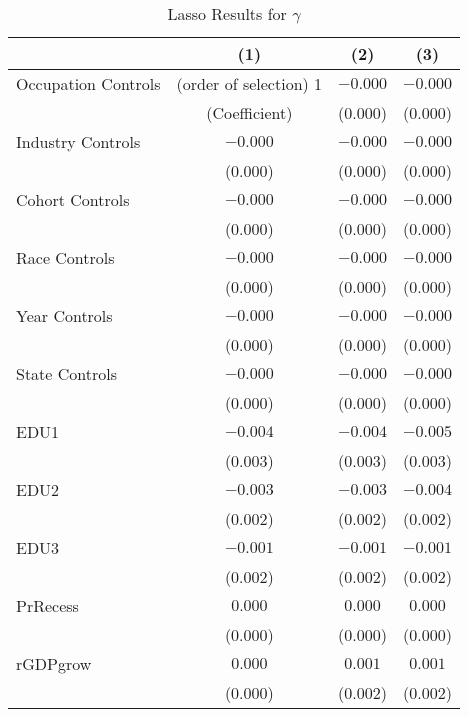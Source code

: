 \documentclass[12pt]{article}
\begin{document}
\begin{table}[ht]
\centering
\caption{Lasso Results for $\gamma$}



\begin{tabular}{lccc}


\toprule
                    & (1)     & (2)   & (3)         \\
\midrule
Occupation Controls      & (order of selection) 1  & $-0.000$    & $-0.000$    \\
                    & (Coefficient)   & (0.000)     & (0.000)     \\
Industry Controls      & $-0.000$  & $-0.000$    & $-0.000$    \\
                    & (0.000)   & (0.000)     & (0.000)     \\
Cohort Controls      & $-0.000$  & $-0.000$    & $-0.000$    \\
                    & (0.000)   & (0.000)     & (0.000)     \\
Race Controls      & $-0.000$  & $-0.000$    & $-0.000$    \\
                    & (0.000)   & (0.000)     & (0.000)     \\
Year Controls      & $-0.000$  & $-0.000$    & $-0.000$    \\
                    & (0.000)   & (0.000)     & (0.000)     \\
State Controls      & $-0.000$  & $-0.000$    & $-0.000$    \\
                    & (0.000)   & (0.000)     & (0.000)     \\
EDU1                & $-0.004$  & $-0.004$    & $-0.005$    \\
                    & (0.003)   & (0.003)     & (0.003)     \\
EDU2                & $-0.003$  & $-0.003$    & $-0.004$    \\
                    & (0.002)   & (0.002)     & (0.002)     \\
EDU3                & $-0.001$  & $-0.001$    & $-0.001$    \\
                    & (0.002)   & (0.002)     & (0.002)     \\
PrRecess            & $0.000$   & $0.000$     & $0.000$     \\
                    & (0.000)   & (0.000)     & (0.000)     \\
rGDPgrow            & $0.000$   & $0.001$     & $0.001$     \\
                    & (0.000)   & (0.002)     & (0.002)     \\

\end{tabular}
\end{table}
\end{document}
